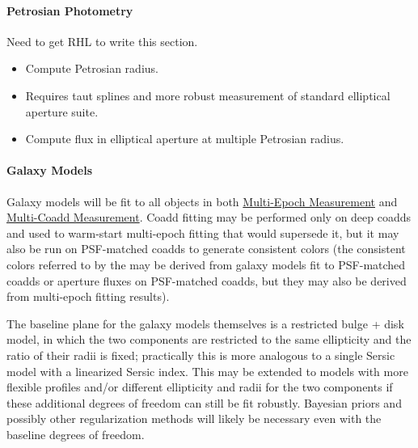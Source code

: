 \paragraph{Petrosian Photometry}
\label{sec:acPetrosianPhotometry}

\begin{note}
Need to get RHL to write this section.
\end{note}

\begin{itemize}
\item Compute Petrosian radius.
\item Requires taut splines and more robust measurement of standard elliptical aperture suite.
\item Compute flux in elliptical aperture at multiple Petrosian radius.
\end{itemize}


\paragraph{Galaxy Models}
\label{sec:acGalaxyModels}

Galaxy models will be fit to all objects in both \hyperref[sec:acMultiEpochMeasurement]{Multi-Epoch Measurement} and \hyperref[sec:acMultiCoaddMeasurement]{Multi-Coadd Measurement}.  Coadd fitting may be performed only on deep coadds and used to warm-start multi-epoch fitting that would supersede it, but it may also be run on PSF-matched coadds to generate consistent colors (the consistent colors referred to by the \DPDD{} may be derived from galaxy models fit to PSF-matched coadds or aperture fluxes on PSF-matched coadds, but they may also be derived from multi-epoch fitting results).

The baseline plane for the galaxy models themselves is a restricted bulge + disk model, in which the two components are restricted to the same ellipticity and the ratio of their radii is fixed; practically this is more analogous to a single Sersic model with a linearized Sersic index.  This may be extended to models with more flexible profiles and/or different ellipticity and radii for the two components if these additional degrees of freedom can still be fit robustly.  Bayesian priors and possibly other regularization methods will likely be necessary even with the baseline degrees of freedom.

